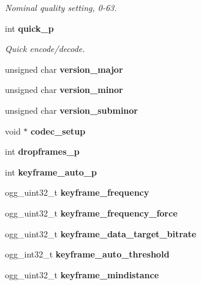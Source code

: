 \begin{CompactItemize}
\begin{CompactList}\small\item\em Nominal quality setting, 0-63. \item\end{CompactList}\item 
int {\bf quick\_\-p}\label{structtheora__info_8ac3973b333ca026c0749a2f2ff044db}

\begin{CompactList}\small\item\em Quick encode/decode. \item\end{CompactList}\item 
unsigned char {\bf version\_\-major}\label{structtheora__info_658d5d9af1546c6a155b652569910935}

\item 
unsigned char {\bf version\_\-minor}\label{structtheora__info_248c4c2c467e75c128e37596c4acefa1}

\item 
unsigned char {\bf version\_\-subminor}\label{structtheora__info_107b3fc2cd72eff290ac665966a806d2}

\item 
void $\ast$ {\bf codec\_\-setup}\label{structtheora__info_7bfcea185ef25b5d1c264a473e1c46bf}

\item 
int {\bf dropframes\_\-p}\label{structtheora__info_1fa7ebf4307a40cae93bd2952ac7b61d}

\item 
int {\bf keyframe\_\-auto\_\-p}\label{structtheora__info_90b808a057363c58eba4fb210729f5bd}

\item 
ogg\_\-uint32\_\-t {\bf keyframe\_\-frequency}\label{structtheora__info_18c71b2258bddb04f72d6e96282b319e}

\item 
ogg\_\-uint32\_\-t {\bf keyframe\_\-frequency\_\-force}\label{structtheora__info_74a72a8f7eac847705d2ebda3703aed7}

\item 
ogg\_\-uint32\_\-t {\bf keyframe\_\-data\_\-target\_\-bitrate}\label{structtheora__info_1ee985972c9ac6447b5b1080eac25c88}

\item 
ogg\_\-int32\_\-t {\bf keyframe\_\-auto\_\-threshold}\label{structtheora__info_5eadc1d55bb41e886fa86164a0870ef9}

\item 
ogg\_\-uint32\_\-t {\bf keyframe\_\-mindistance}\label{structtheora__info_5cd8291a9c734b51d96a68e9fd890969}


\end{CompactItemize}
